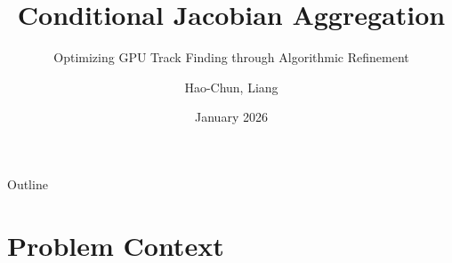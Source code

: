 \documentclass[aspectratio=169, table]{beamer}
\title{Conditional Jacobian Aggregation}
\subtitle{Optimizing GPU Track Finding through Algorithmic Refinement}
\author{Hao-Chun, Liang}
\institute{GPU Optimization for ACTS/traccc}
\date{January 2026}
\begin{document}
\begin{frame}
    \titlepage
    \vspace{-1.5em} %
\end{frame}

\begin{frame}{Outline}
\tableofcontents
\end{frame}

\section{Problem Context}
\end{document}
